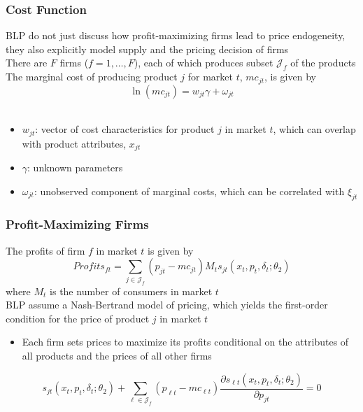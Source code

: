 \documentclass{beamer}
\begin{document}
\begin{frame}\frametitle{Cost Function}
    BLP do not just discuss how profit-maximizing firms lead to price endogeneity, they also explicitly model supply and the pricing decision of firms \\
    \vspace{2ex}
    There are $F$ firms ($f = 1, \ldots, F$), each of which produces subset $\mathcal{J}_f$ of the products \\
    \vspace{2ex}
    The marginal cost of producing product $j$ for market $t$, $mc_{jt}$, is given by
    $$\ln(mc_{jt}) = w_{jt} \gamma + \omega_{jt}$$ \\
    \vspace{-1ex}
    \begin{itemize}
        \item $w_{jt}$: vector of cost characteristics for product $j$ in market $t$, which can overlap with product attributes, $x_{jt}$
        \item $\gamma$: unknown parameters
        \item $\omega_{jt}$: unobserved component of marginal costs, which can be correlated with $\xi_{jt}$
    \end{itemize}
\end{frame}

\begin{frame}\frametitle{Profit-Maximizing Firms}
    The profits of firm $f$ in market $t$ is given by
    $$Profits_{ft} = \sum_{j \in \mathcal{J}_f} (p_{jt} - mc_{jt}) M_t s_{jt}(x_t, p_t, \delta_t; \theta_2)$$
    where $M_t$ is the number of consumers in market $t$ \\
    \vspace{2ex}
    BLP assume a Nash-Bertrand model of pricing, which yields the first-order condition for the price of product $j$ in market $t$
    \begin{itemize}
        \item Each firm sets prices to maximize its profits conditional on the attributes of all products and the prices of all other firms
    \end{itemize}
    \vspace{1ex}
    $$s_{jt}(x_t, p_t, \delta_t; \theta_2) + \sum_{\ell \in \mathcal{J}_f} (p_{\ell t} - mc_{\ell t}) \frac{\partial s_{\ell t}(x_t, p_t, \delta_t; \theta_2)}{\partial p_{jt}} = 0$$
\end{frame}
\end{document}
